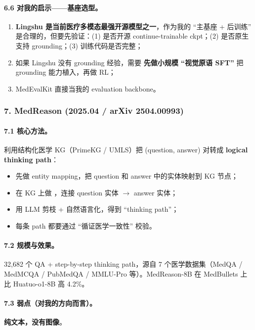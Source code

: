 \paragraph{6.6 对我的启示——基座选型。}

\begin{enumerate}[leftmargin=1.5em]
  \item \textbf{Lingshu 是当前医疗多模态最强开源模型之一}，作为我的 ``主基座 + 后训练'' 是合理的，但要先验证：(1) 是否开源 continue-trainable ckpt；(2) 是否原生支持 grounding；(3) 训练代码是否完整；
  \item 如果 Lingshu 没有 grounding 经验，需要 \textbf{先做小规模 ``视觉原语 SFT''} 把 grounding 能力植入，再做 RL；
  \item MedEvalKit 直接当我的 evaluation backbone。
\end{enumerate}

\subsubsection*{7. MedReason (2025.04 / arXiv 2504.00993)}

\paragraph{7.1 核心方法。}
利用结构化医学 KG（PrimeKG / UMLS）把 (question, answer) 对转成 \textbf{logical thinking path}：
\begin{itemize}[leftmargin=1.5em]
  \item 先做 entity mapping，把 question 和 answer 中的实体映射到 KG 节点；
  \item 在 KG 上做 ，连接 question 实体 $\to$ answer 实体；
  \item 用 LLM 剪枝 + 自然语言化，得到 ``thinking path''；
  \item 每条 path 都要通过 ``循证医学一致性'' 校验。
\end{itemize}

\paragraph{7.2 规模与效果。}
32,682 个 QA + step-by-step thinking path，源自 7 个医学数据集（MedQA / MedMCQA / PubMedQA / MMLU-Pro 等）。MedReason-8B 在 MedBullets 上比 Huatuo-o1-8B 高 4.2\%。

\paragraph{7.3 弱点（对我的方向而言）。}
\textbf{纯文本，没有图像}。

